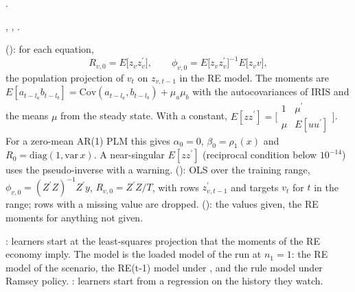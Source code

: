 \documentclass[11pt,a4paper]{article}
\DeclareRobustCommand{\codem}[1]{\texttt{\detokenize{#1}}}
\newenvironment{optspec}%
  {\begin{description}[style=sameline,leftmargin=2.7cm,labelwidth=2.5cm,font=\normalfont\itshape]}%
  {\end{description}}
\newcommand{\transp}{^{\prime}}
\begin{document}
\subsubsection{\texorpdfstring{\codem{beliefs.init.method}}{beliefs.init.method}}\label{opt:beliefs-init-method}
\begin{optspec}
  \item[Default]  \citep[sec.~3.1]{ozden2025}.
  \item[Values] , , .
  \item[Math]  (): for each equation,
        \begin{equation}\label{eq:remoments}
          R_{v,0} = E\bigl[z_{v} z_{v}\transp\bigr], \qquad \phi_{v,0} = E\bigl[z_v z_v\transp\bigr]^{-1} E\bigl[z_v v\bigr],
        \end{equation}
        the population projection of $v_t$ on $z_{v,t-1}$ in the RE model. The moments are
        $E[a_{t-l_a} b_{t-l_b}] = \mathrm{Cov}(a_{t-l_a}, b_{t-l_b}) + \mu_a\mu_b$ with the
        autocovariances of IRIS  and the means $\mu$ from
        the steady state. With a constant, $E[zz\transp] = \bigl[\begin{smallmatrix}1 & \mu\transp\\ \mu & E[uu\transp]\end{smallmatrix}\bigr]$.
        For a zero-mean AR(1) PLM this gives $\alpha_0 = 0$, $\beta_0 = \rho_1(x)$ and
        $R_0 = \mathrm{diag}(1, \mathrm{var}\,x)$. A near-singular $E[zz\transp]$ (reciprocal
        condition below $10^{-14}$) uses the pseudo-inverse with a warning.
         (): OLS over the training range,
        $\phi_{v,0} = (Z\transp Z)^{-1}Z\transp y$, $R_{v,0} = Z\transp Z / T$, with rows $z_{v,t-1}\transp$ and
        targets $v_t$ for $t$ in the range; rows with a missing value are dropped.
         (): the values given, the RE moments for anything not
        given.
  \item[Assumptions] : learners start at the least-squares projection that the
        moments of the RE economy imply. The model is the loaded model of
        the run at $n_1=1$: the RE model of the scenario, the RE(t-1) model under
        , and the rule model under Ramsey policy.
        : learners start from a regression on the history they watch.

\end{optspec}
\end{document}
